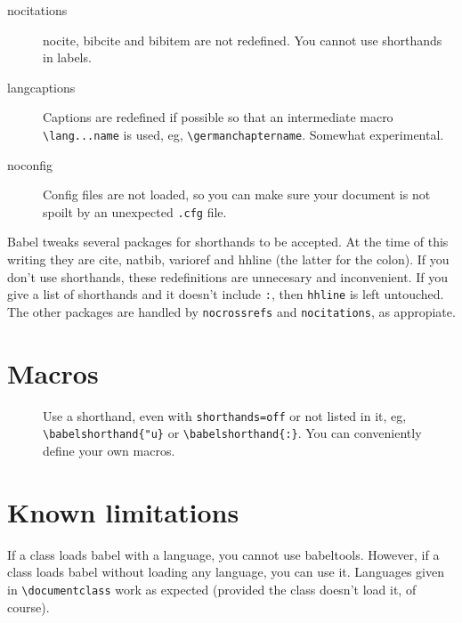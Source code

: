 \documentclass{article}
\begin{document}
\begin{description}
\item[nocitations] nocite, bibcite and bibitem are not redefined. You 
cannot use shorthands in labels.

\item[langcaptions] Captions are redefined if possible so that an
intermediate macro \verb|\lang...name| is used, eg,
\verb|\germanchaptername|.  Somewhat experimental.

\item[noconfig] Config files are not loaded, so you can make sure your
document is not spoilt by an unexpected \texttt{.cfg} file.
\end{description}

Babel tweaks several packages for shorthands to be accepted.  At the
time of this writing they are \textsf{cite}, \textsf{natbib},
\textsf{varioref} and \textsf{hhline} (the latter for the colon).  If
you don't use shorthands, these redefinitions are unnecesary and
inconvenient.  If you give a list of shorthands and it doesn't include
\verb|:|, then \verb|hhline| is left untouched.  The other packages
are handled by \texttt{nocrossrefs} and \texttt{nocitations}, as
appropiate.

\section{Macros}

\begin{description}
\item[\ttfamily\string\babelshorthand] Use a shorthand, even with
\texttt{shorthands=off} or not listed in it, eg,
\verb|\babelshorthand{"u}| or \verb|\babelshorthand{:}|.  You can
conveniently define your own macros.
\end{description}

\section{Known limitations}

If a class loads \textsf{babel} with a language, you cannot use
\textsf{babeltools}.  However, if a class loads babel without loading
any language, you can use it.  Languages given in
\verb|\documentclass| work as expected (provided the class doesn't
load it, of course).
\end{document}
